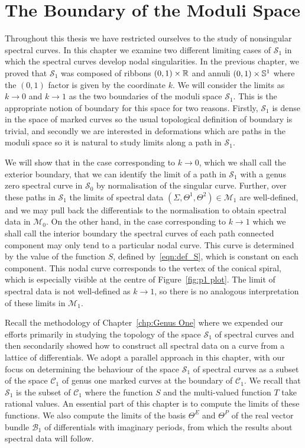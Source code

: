 
\chapter{The Boundary of the Moduli Space}
\label{chp:Moduli Boundary}

Throughout this thesis we have restricted ourselves to the study of nonsingular spectral curves. In this chapter we examine two different limiting cases of $\mathcal{S}_1$ in which the spectral curves develop nodal singularities.
In the previous chapter, we proved that $\mathcal{S}_1$ was composed of ribbons $(0,1)\times \R$ and annuli $(0,1) \times \S^1$ where the $(0,1)$ factor is given by the coordinate $k$. We will consider the limits as $k \to 0$ and $k \to 1$ as the two boundaries of the moduli space $\mathcal{S}_1$. This is the appropriate notion of boundary for this space for two reasons. Firstly, $\mathcal{S}_1$ is dense in the space of marked curves so the usual topological definition of boundary is trivial, and secondly we are interested in deformations which are paths in the moduli space so it is natural to study limits along a path in $\mathcal{S}_1$.

We will show that in the case corresponding to $k \to 0$, which we shall call the exterior boundary, that we can identify the limit of a path in $\mathcal{S}_1$ with a genus zero spectral curve in $\mathcal{S}_0$ by normalisation of the singular curve. Further, over these paths in $\mathcal{S}_1$ the limits of spectral data $(Σ,Θ^1,Θ^2) \in \mathcal{M}_1$ are well-defined, and we may pull back the differentials to the normalisation to obtain spectral data in $\mathcal{M}_0$. On the other hand, in the case corresponding to $k \to 1$ which we shall call the interior boundary the spectral curves of each path connected component may only tend to a particular nodal curve. This curve is determined by the value of the function $S$, defined by~\eqref{eqn:def_S}, which is constant on each component. This nodal curve corresponds to the vertex of the conical spiral, which is especially visible at the centre of Figure~\ref{fig:p1 plot}. The limit of spectral data is not well-defined as $k \to 1$, so there is no analogous interpretation of these limits in $\mathcal{M}_1$.

Recall the methodology of Chapter~\ref{chp:Genus One} where we expended our efforts primarily in studying the topology of the space $\mathcal{S}_1$ of spectral curves and then secondarily showed how to construct all spectral data on a curve from a lattice of differentials.
We adopt a parallel approach in this chapter, with our focus on determining the behaviour of the space $\mathcal{S}_1$ of spectral curves as a subset of the space $\mathcal{C}_1$ of genus one marked curves at the boundary of $\mathcal{C}_1$. We recall that $\mathcal{S}_1$ is the subset of $\mathcal{C}_1$ where the function $S$ and the multi-valued function $T$ take rational values. An essential part of this chapter is to compute the limits of these functions. We also compute the limits of the basis $Θ^E$ and $Θ^P$ of the real vector bundle $\mathcal{B}_1$ of differentials with imaginary periods, from which the results about spectral data will follow.

